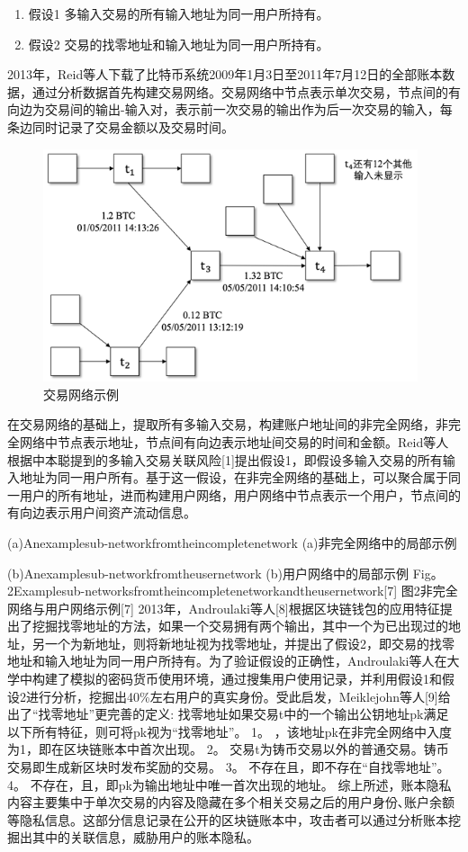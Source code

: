 \begin{enumerate}
	\item 假设1 多输入交易的所有输入地址为同一用户所持有。
	\item 假设2 交易的找零地址和输入地址为同一用户所持有。
\end{enumerate}

2013年，Reid等人下载了比特币系统2009年1月3日至2011年7月12日的全部账本数据，通过分析数据首先构建交易网络。交易网络中节点表示单次交易，节点间的有向边为交易间的输出-输入对，表示前一次交易的输出作为后一次交易的输入，每条边同时记录了交易金额以及交易时间。

\begin{figure}
\centering
\includegraphics[width=11cm]{figures/sub-network.png}
\caption{交易网络示例}
\label{fig:framework}
\end{figure}

在交易网络的基础上，提取所有多输入交易，构建账户地址间的非完全网络，非完全网络中节点表示地址，节点间有向边表示地址间交易的时间和金额。Reid等人根据中本聪提到的多输入交易关联风险[1]提出假设1，即假设多输入交易的所有输入地址为同一用户所有。基于这一假设，在非完全网络的基础上，可以聚合属于同一用户的所有地址，进而构建用户网络，用户网络中节点表示一个用户，节点间的有向边表示用户间资产流动信息。

(a)Anexamplesub-networkfromtheincompletenetwork
(a)非完全网络中的局部示例

(b)Anexamplesub-networkfromtheusernetwork
(b)用户网络中的局部示例
Fig。2Examplesub-networksfromtheincompletenetworkandtheusernetwork[7]
图2非完全网络与用户网络示例[7]
	2013年，Androulaki等人[8]根据区块链钱包的应用特征提出了挖掘找零地址的方法，如果一个交易拥有两个输出，其中一个为已出现过的地址，另一个为新地址，则将新地址视为找零地址，并提出了假设2，即交易的找零地址和输入地址为同一用户所持有。为了验证假设的正确性，Androulaki等人在大学中构建了模拟的密码货币使用环境，通过搜集用户使用记录，并利用假设1和假设2进行分析，挖掘出40\%左右用户的真实身份。受此启发，Meiklejohn等人[9]给出了“找零地址”更完善的定义:
	找零地址如果交易t中的一个输出公钥地址pk满足以下所有特征，则可将pk视为“找零地址”。
1。	，该地址pk在非完全网络中入度为1，即在区块链账本中首次出现。
2。	交易t为铸币交易以外的普通交易。铸币交易即生成新区块时发布奖励的交易。
3。	不存在且，即不存在“自找零地址”。
4。	不存在，且，即pk为输出地址中唯一首次出现的地址。
综上所述，账本隐私内容主要集中于单次交易的内容及隐藏在多个相关交易之后的用户身份､账户余额等隐私信息。这部分信息记录在公开的区块链账本中，攻击者可以通过分析账本挖掘出其中的关联信息，威胁用户的账本隐私。

